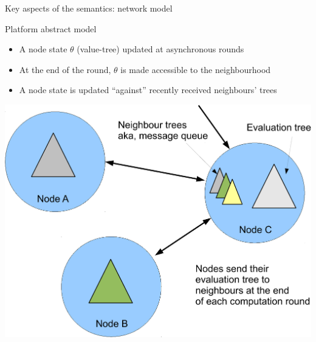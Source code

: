 \documentclass[presentation, 8pt]{beamer}\mode<presentation>{\usetheme{AMSBolognaFC}}
\begin{document}
\begin{frame}{Key aspects of the semantics: network model}
	\begin{exampleblock}{Platform abstract model}
	\begin{itemize}
			\item A node state $\theta$ (value-tree) updated at asynchronous rounds
			\item At the end of the round, $\theta$ is made accessible to the neighbourhood
			\item A node state is updated ``against'' recently received neighbours' trees
	\end{itemize}
	\end{exampleblock}
	\centering
	\includegraphics[height=0.5\textheight]{img/nodes.pdf}
	\end{frame}
	
\end{document}
